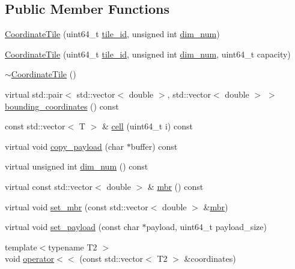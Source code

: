 \subsection*{Public Member Functions}
\begin{DoxyCompactItemize}
\item 
\hyperlink{classCoordinateTile_aadff684690fb19be5636b3754b8a3ad0}{Coordinate\+Tile} (uint64\+\_\+t \hyperlink{classTile_a71625eedc3af0cb961f2ab213384f791}{tile\+\_\+id}, unsigned int \hyperlink{classCoordinateTile_a0cda1c5b005e93f8f0100813825b413f}{dim\+\_\+num})
\item 
\hyperlink{classCoordinateTile_ac50fc8fce140795685aef630e3c6eae7}{Coordinate\+Tile} (uint64\+\_\+t \hyperlink{classTile_a71625eedc3af0cb961f2ab213384f791}{tile\+\_\+id}, unsigned int \hyperlink{classCoordinateTile_a0cda1c5b005e93f8f0100813825b413f}{dim\+\_\+num}, uint64\+\_\+t capacity)
\item 
\hyperlink{classCoordinateTile_a0de55319aa462bbfe4559cfbc8732533}{$\sim$\+Coordinate\+Tile} ()
\item 
virtual std\+::pair$<$ std\+::vector$<$ double $>$, std\+::vector$<$ double $>$ $>$ \hyperlink{classCoordinateTile_ac07b0e8b543df680c704dc8e73fbbabe}{bounding\+\_\+coordinates} () const 
\item 
const std\+::vector$<$ T $>$ \& \hyperlink{classCoordinateTile_aa14fa596afafc4bdba343489af5cc549}{cell} (uint64\+\_\+t i) const 
\item 
virtual void \hyperlink{classCoordinateTile_acdbead96880fdf2424094909a89be9b7}{copy\+\_\+payload} (char $\ast$buffer) const 
\item 
virtual unsigned int \hyperlink{classCoordinateTile_a0cda1c5b005e93f8f0100813825b413f}{dim\+\_\+num} () const 
\item 
virtual const std\+::vector$<$ double $>$ \& \hyperlink{classCoordinateTile_a8818409c637ebacbe958b97d73989f47}{mbr} () const 
\item 
virtual void \hyperlink{classCoordinateTile_a32f166495e2d659c02a22c40e0f13df3}{set\+\_\+mbr} (const std\+::vector$<$ double $>$ \&\hyperlink{classCoordinateTile_a8818409c637ebacbe958b97d73989f47}{mbr})
\item 
virtual void \hyperlink{classCoordinateTile_a66fc504f7c19d0c567e16e9c7c8a39e6}{set\+\_\+payload} (const char $\ast$payload, uint64\+\_\+t payload\+\_\+size)
\item 
{\footnotesize template$<$typename T2 $>$ }\\void \hyperlink{classCoordinateTile_abd0211999559a83c29059092c04e95cc}{operator$<$$<$} (const std\+::vector$<$ T2 $>$ \&coordinates)

\end{DoxyCompactItemize}
